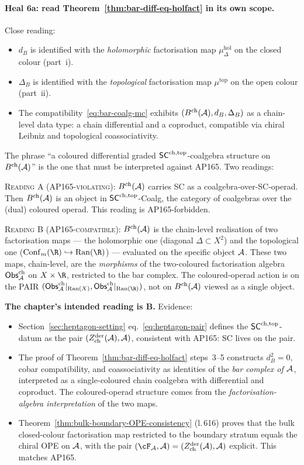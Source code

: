 \paragraph{Heal 6a: read Theorem~\ref*{thm:bar-diff-eq-holfact} in its own scope.} Close reading:
\begin{itemize}
\item $d_B$ is identified with the \emph{holomorphic} factorisation map $\mu^{\mathrm{hol}}_\Delta$ on the closed colour (part~i).
\item $\Delta_B$ is identified with the \emph{topological} factorisation map $\mu^{\mathrm{top}}$ on the open colour (part~ii).
\item The compatibility~\eqref*{eq:bar-coalg-mc} exhibits $(B^{\mathrm{ch}}(\mathcal{A}), d_B, \Delta_B)$ as a chain-level data type: a chain differential and a coproduct, compatible via chiral Leibniz and topological coassociativity.
\end{itemize}

The phrase ``a coloured differential graded $\mathsf{SC}^{\mathrm{ch},\mathrm{top}}$-coalgebra structure on $B^{\mathrm{ch}}(\mathcal{A})$'' is the one that must be interpreted against AP165. Two readings:

\textsc{Reading A (AP165-violating)}: $B^{\mathrm{ch}}(\mathcal{A})$ carries SC as a coalgebra-over-SC-operad. Then $B^{\mathrm{ch}}(\mathcal{A})$ is an object in $\mathsf{SC}^{\mathrm{ch},\mathrm{top}}$-Coalg, the category of coalgebras over the (dual) coloured operad. This reading is AP165-forbidden.

\textsc{Reading B (AP165-compatible)}: $B^{\mathrm{ch}}(\mathcal{A})$ is the chain-level realisation of two factorisation maps --- the holomorphic one (diagonal $\Delta \subset X^2$) and the topological one ($\Conf_m(\R) \hookrightarrow \Ran(\R)$) --- evaluated on the specific object $\mathcal{A}$. These two maps, chain-level, are the \emph{morphisms} of the two-coloured factorisation algebra $\mathsf{Obs}^{\mathrm{ch}}_{\mathcal{A}}$ on $X \times \R$, restricted to the bar complex. The coloured-operad action is on the PAIR $(\Obs^{\mathrm{ch}}_\cA|_{\Ran(X)}, \Obs^{\mathrm{ch}}_\cA|_{\Ran(\R)})$, not on $B^{\mathrm{ch}}(\mathcal{A})$ viewed as a single object.

\textbf{The chapter's intended reading is B.} Evidence:
\begin{itemize}
\item Section~\ref*{sec:heptagon-setting} eq.~\eqref*{eq:heptagon-pair} defines the $\mathsf{SC}^{\mathrm{ch},\mathrm{top}}$-datum as the pair $(Z^{\mathrm{der}}_{\mathrm{ch}}(\mathcal{A}), \mathcal{A})$, consistent with AP165: SC lives on the pair.
\item The proof of Theorem~\ref*{thm:bar-diff-eq-holfact} steps~3--5 constructs $d_B^2 = 0$, cobar compatibility, and coassociativity as identities of the \emph{bar complex of $\mathcal{A}$}, interpreted as a single-coloured chain coalgebra with differential and coproduct. The coloured-operad structure comes from the \emph{factorisation-algebra interpretation} of the two maps.
\item Theorem~\ref*{thm:bulk-boundary-OPE-consistency} (l.\,616) proves that the bulk closed-colour factorisation map restricted to the boundary stratum equals the chiral OPE on $\mathcal{A}$, with the pair $(\cF_\cA, \cA) = (Z^{\mathrm{der}}_{\mathrm{ch}}(\cA), \cA)$ explicit. This matches AP165.
\end{itemize}

